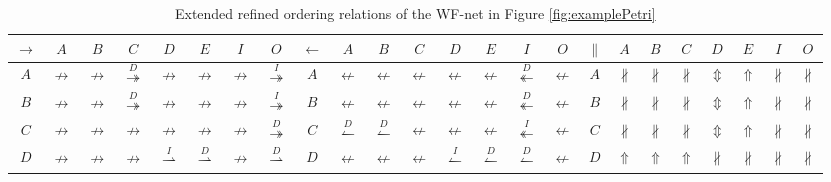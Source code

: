 \documentclass{llncs}
\begin{document}
\begin{table}[htbp]
\centering
\caption{Extended refined ordering relations of the WF-net in Figure \ref{fig:examplePetri}\label{tab:example_relations}}
\begin{tabular}{|c|c|c|c|c|c|c|c!{\vrule width 1.5pt}c|c|c|c|c|c|c|c!{\vrule width 1.5pt}c|c|c|c|c|c|c|c|} \hline
	$\rightarrow$ & $A$ & $B$ & $C$ & $D$ & $E$ & $I$ & $O$ & 
	$\leftarrow$ & $A$ & $B$ & $C$ & $D$ & $E$ & $I$ & $O$ & 
	$\parallel$ & $A$ & $B$ & $C$ & $D$ & $E$ & $I$ & $O$\\ \hline
	
	$A$ & $\nrightarrow$ & $\nrightarrow$ & $\overset{D}{\twoheadrightarrow}$ & $\nrightarrow$ & $\nrightarrow$ & $\nrightarrow$ & $\overset{I}{\twoheadrightarrow}$ &
	$A$ & $\nleftarrow$ & $\nleftarrow$ & $\nleftarrow$ & $\nleftarrow$ & $\nleftarrow$ & $\overset{D}{\twoheadleftarrow}$ & $\nleftarrow$ &
	$A$ & $\nparallel$ & $\nparallel$ & $\nparallel$ & $\Updownarrow$ & $\Uparrow$ & $\nparallel$ & $\nparallel$\\ \hline

	$B$ & $\nrightarrow$ & $\nrightarrow$ & $\overset{D}{\twoheadrightarrow}$ & $\nrightarrow$ & $\nrightarrow$ & $\nrightarrow$ & $\overset{I}{\twoheadrightarrow}$ &
	$B$ & $\nleftarrow$ & $\nleftarrow$ & $\nleftarrow$ & $\nleftarrow$ & $\nleftarrow$ & $\overset{D}{\twoheadleftarrow}$ & $\nleftarrow$ &
	$B$ & $\nparallel$ & $\nparallel$ & $\nparallel$ & $\Updownarrow$ & $\Uparrow$ & $\nparallel$ & $\nparallel$\\ \hline

	$C$ & $\nrightarrow$ & $\nrightarrow$ & $\nrightarrow$ & $\nrightarrow$ & $\nrightarrow$ & $\nrightarrow$ & $\overset{D}{\twoheadrightarrow}$ &
	$C$ & $\overset{D}{\leftharpoonup}$ & $\overset{D}{\leftharpoonup}$ & $\nleftarrow$ & $\nleftarrow$ & $\nleftarrow$ & $\overset{I}{\twoheadleftarrow}$ & $\nleftarrow$ &
	$C$ & $\nparallel$ & $\nparallel$ & $\nparallel$ & $\Updownarrow$ & $\Uparrow$ & $\nparallel$ & $\nparallel$\\ \hline

	$D$ & $\nrightarrow$ & $\nrightarrow$ & $\nrightarrow$ & $\overset{I}{\rightharpoonup}$ & $\overset{D}{\rightharpoonup}$ & $\nrightarrow$ & $\overset{D}{\rightharpoonup}$ &
	$D$ & $\nleftarrow$ & $\nleftarrow$ & $\nleftarrow$ & $\overset{I}{\leftharpoonup}$ & $\overset{D}{\leftharpoonup}$ & $\overset{D}{\leftharpoonup}$ & $\nleftarrow$ &
	$D$ & $\Uparrow$ & $\Uparrow$ & $\Uparrow$ & $\nparallel$ & $\nparallel$ & $\nparallel$ & $\nparallel$\\ \hline


\end{tabular}
\end{table}
\end{document}
